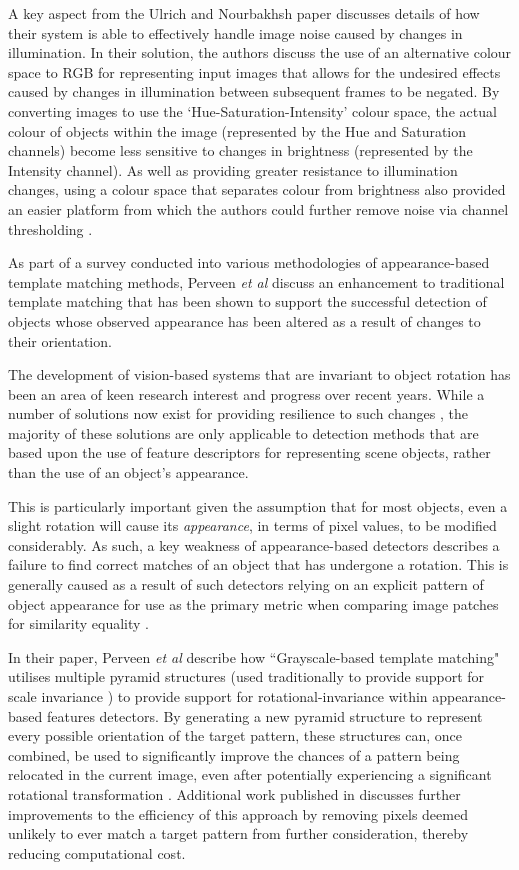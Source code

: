 A key aspect from the Ulrich and Nourbakhsh paper discusses details of how their system is able to effectively handle image noise caused by changes in illumination. In their solution, the authors discuss the use of an alternative colour space to RGB for representing input images that allows for the undesired effects caused by changes in illumination between subsequent frames to be negated. By converting images to use the `Hue-Saturation-Intensity' colour space, the actual colour of objects within the image (represented by the Hue and Saturation channels) become less sensitive to changes in brightness (represented by the Intensity channel). As well as providing greater resistance to illumination changes, using a colour space that separates colour from brightness also provided an easier platform from which the authors could further remove noise via channel thresholding \cite{ulrich-nourbakhsh}. 

As part of a survey conducted into various methodologies of appearance-based template matching methods, Perveen \textit{et al} \cite{perveen} discuss an enhancement to traditional template matching that has been shown to support the successful detection of objects whose observed appearance has been altered as a result of changes to their orientation. 

  The development of vision-based systems that are invariant to object rotation has been an area of keen research interest and progress over recent years. While a number of solutions now exist for providing resilience to such changes \cite{sift}, the majority of these solutions are only applicable to detection methods that are based upon the use of feature descriptors for representing scene objects, rather than the use of an object's appearance. 
  
  This is particularly important given the assumption that for most objects, even a slight rotation will cause its \textit{appearance}, in terms of pixel values, to be modified considerably. As such, a key weakness of appearance-based detectors describes a failure to find correct matches of an object that has undergone a rotation. This is generally caused as a result of such detectors relying on an explicit pattern of object appearance for use as the primary metric when comparing image patches for similarity equality \cite{find-citation}.
 
 In their paper, Perveen \textit{et al} describe how ``Grayscale-based template matching" utilises multiple pyramid structures (used traditionally to provide support for scale invariance \cite{lowe}) to provide support for rotational-invariance within appearance-based features detectors. By generating a new pyramid structure to represent every possible orientation of the target pattern, these structures can, once combined, be used to significantly improve the chances of a pattern being relocated in the current image, even after potentially experiencing a significant rotational transformation \cite{perveen}. Additional work published in \cite{kim} discusses further improvements to the efficiency of this approach by removing pixels deemed unlikely to ever match a target pattern from further consideration, thereby reducing computational cost. 

